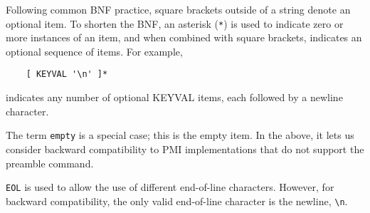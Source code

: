 \documentclass{article}
\begin{document}
Following common BNF practice, square brackets outside of a string
denote an optional item.  To shorten the BNF, an asterisk (\texttt{*})
is used to indicate zero or more instances of an item, and when
combined with square brackets, indicates an optional sequence of
items.  For example, 
\begin{verbatim}
    [ KEYVAL '\n' ]*
\end{verbatim}
indicates any number of optional KEYVAL items, each followed by a
newline character.

The term \texttt{empty} is a special case; this is the empty item.  In
the above, it lets us consider backward compatibility to PMI
implementations that do not support the preamble command.

\texttt{EOL} is used to allow the use of different end-of-line characters.
However, for backward compatibility, the only valid end-of-line character is
the newline, {\tt\verb+\n+}.
\end{document}
